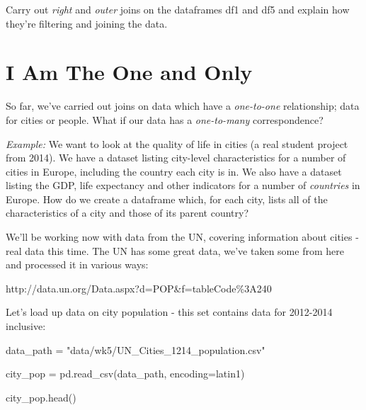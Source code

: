 \documentclass[
  letterpaper,
  DIV=11,
  numbers=noendperiod]{scrreprt}
\newenvironment{Shaded}{\begin{snugshade}}{\end{snugshade}}
\newcommand{\NormalTok}[1]{\textcolor[rgb]{0.00,0.23,0.31}{#1}}
\newcommand{\OperatorTok}[1]{\textcolor[rgb]{0.37,0.37,0.37}{#1}}
\newcommand{\StringTok}[1]{\textcolor[rgb]{0.13,0.47,0.30}{#1}}
\begin{document}
Carry out \emph{right} and \emph{outer} joins on the dataframes df1 and
df5 and explain how they're filtering and joining the data.

\hypertarget{i-am-the-one-and-only}{%
\section{I Am The One and Only}\label{i-am-the-one-and-only}}

So far, we've carried out joins on data which have a \emph{one-to-one}
relationship; data for cities or people. What if our data has a
\emph{one-to-many} correspondence?

\emph{Example:} We want to look at the quality of life in cities (a real
student project from 2014). We have a dataset listing city-level
characteristics for a number of cities in Europe, including the country
each city is in. We also have a dataset listing the GDP, life expectancy
and other indicators for a number of \emph{countries} in Europe. How do
we create a dataframe which, for each city, lists all of the
characteristics of a city and those of its parent country?

We'll be working now with data from the UN, covering information about
cities - real data this time. The UN has some great data, we've taken
some from here and processed it in various ways:

http://data.un.org/Data.aspx?d=POP\&f=tableCode\%3A240

Let's load up data on city population - this set contains data for
2012-2014 inclusive:

\begin{Shaded}
\begin{Highlighting}[]
\NormalTok{data\_path }\OperatorTok{=} \StringTok{"data/wk5/UN\_Cities\_1214\_population.csv"}

\NormalTok{city\_pop }\OperatorTok{=}\NormalTok{ pd.read\_csv(data\_path, encoding}\OperatorTok{=}\StringTok{\textquotesingle{}latin1\textquotesingle{}}\NormalTok{)}
\end{Highlighting}
\end{Shaded}

\begin{Shaded}
\begin{Highlighting}[]
\NormalTok{city\_pop.head()}
\end{Highlighting}
\end{Shaded}
\end{document}
